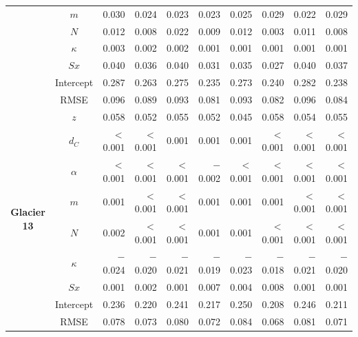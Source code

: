 \documentclass{sfuthesis}
\begin{document}
{\begin{table}
\begin{tabular}{ccrrrrrrrr}
 & $m$ & 0.030 & 0.024 & 0.023 & 0.023 & 0.025 & 0.029 & 0.022 & 0.029 \\
 & $N$ & 0.012 & 0.008 & 0.022 & 0.009 & 0.012 & 0.003 & 0.011 & 0.008 \\
 & $\kappa$ & 0.003 & 0.002 & 0.002 & 0.001 & 0.001 & 0.001 & 0.001 & 0.001 \\
 & $Sx$ & 0.040 & 0.036 & 0.040 & 0.031 & 0.035 & 0.027 & 0.040 & 0.037 \\
 & Intercept & 0.287 & 0.263 & 0.275 & 0.235 & 0.273 & 0.240 & 0.282 & 0.238 \\
 & RMSE & 0.096 & 0.089 & 0.093 & 0.081 & 0.093 & 0.082 & 0.096 & 0.084 \\ \hline
\multirow{9}{*}{\textbf{Glacier 13}} & $z$ & 0.058 & 0.052 & 0.055 & 0.052 & 0.045 & 0.058 & 0.054 & 0.055 \\
 & $d_C$ & $<$0.001 & $<$0.001 & 0.001 & 0.001 & 0.001 & $<$0.001 & $<$0.001 & $<$0.001 \\
 & $\alpha$ & $<$0.001 & $<$0.001 & $<$0.001 & $-$0.002 & $<$0.001 & $<$0.001 & $<$0.001 & $<$0.001 \\
 & $m$ & 0.001 & $<$0.001 & $<$0.001 & 0.001 & 0.001 & 0.001 & $<$0.001 & $<$0.001 \\
 & $N$ & 0.002 & $<$0.001 & $<$0.001 & 0.001 & 0.001 & $<$0.001 & $<$0.001 & $<$0.001 \\
 & $\kappa$ & $-$0.024 & $-$0.020 & $-$0.021 & $-$0.019 & $-$0.023 & $-$0.018 & $-$0.021 & $-$0.020 \\
 & $Sx$ & 0.001 & 0.002 & 0.001 & 0.007 & 0.004 & 0.008 & 0.001 & 0.001 \\
 & Intercept & 0.236 & 0.220 & 0.241 & 0.217 & 0.250 & 0.208 & 0.246 & 0.211 \\
 & RMSE & 0.078 & 0.073 & 0.080 & 0.072 & 0.084 & 0.068 & 0.081 & 0.071
\end{tabular}
\end{table}

}
\end{document}
